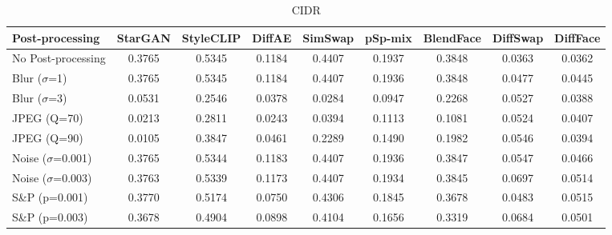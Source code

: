 \documentclass{article}
\begin{document}
\begin{table}[h!]
\begin{subtable}{\textwidth}
\caption{CIDR}
\centering
\scriptsize
\begin{tabular}{lcccccccc}
\toprule
\textbf{Post-processing} & StarGAN & StyleCLIP & DiffAE & SimSwap & pSp-mix & BlendFace & DiffSwap & DiffFace \\
\midrule
No Post-processing & 0.3765 & 0.5345 & 0.1184 & 0.4407 & 0.1937 & 0.3848 & 0.0363 & 0.0362 \\
\midrule
Blur ($\sigma$=1) & 0.3765 & 0.5345 & 0.1184 & 0.4407 & 0.1936 & 0.3848 & 0.0477 & 0.0445\\
Blur ($\sigma$=3) & 0.0531 & 0.2546 & 0.0378 & 0.0284 & 0.0947 & 0.2268 & 0.0527 & 0.0388\\
JPEG (Q=70) & 0.0213 & 0.2811 & 0.0243 & 0.0394 & 0.1113 & 0.1081 & 0.0524 & 0.0407\\
JPEG (Q=90) & 0.0105 & 0.3847 & 0.0461 & 0.2289 & 0.1490 & 0.1982 & 0.0546 & 0.0394\\
Noise ($\sigma$=0.001) & 0.3765 & 0.5344 & 0.1183 & 0.4407 & 0.1936 & 0.3847 & 0.0547 & 0.0466\\
Noise ($\sigma$=0.003) & 0.3763 & 0.5339 & 0.1173 & 0.4407 & 0.1934 & 0.3845 & 0.0697 & 0.0514\\
S\&P (p=0.001) & 0.3770 & 0.5174 & 0.0750 & 0.4306 & 0.1845 & 0.3678 & 0.0483 & 0.0515\\
S\&P (p=0.003) & 0.3678 & 0.4904 & 0.0898 & 0.4104 & 0.1656 & 0.3319 & 0.0684 & 0.0501\\
\bottomrule
\end{tabular}
\end{subtable}


\end{table}
\end{document}
